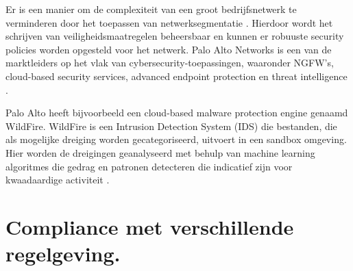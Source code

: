 Er is een manier om de complexiteit van een groot bedrijfsnetwerk te verminderen door het toepassen van netwerksegmentatie \autocite{Bringhenti2023}. Hierdoor wordt het schrijven van veiligheidsmaatregelen beheersbaar en kunnen er robuuste security policies worden opgesteld voor het netwerk. Palo Alto Networks is een van de marktleiders op het vlak van cybersecurity-toepassingen, waaronder NGFW’s, cloud-based security services, advanced endpoint protection en threat intelligence \autocite{TechnicalWhitepaper2014}.

Palo Alto heeft bijvoorbeeld een cloud-based malware protection engine genaamd WildFire. WildFire is een Intrusion Detection System (IDS) die bestanden, die als mogelijke dreiging worden gecategoriseerd, uitvoert in een sandbox omgeving. Hier worden de dreigingen geanalyseerd met behulp van machine learning algoritmes die gedrag en patronen detecteren die indicatief zijn voor kwaadaardige activiteit \autocite{PaloAltoWF2024}.




\section{Compliance met verschillende regelgeving.}
